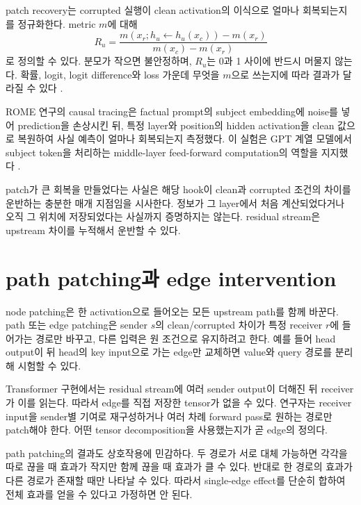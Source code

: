 patch recovery는 corrupted 실행이 clean activation의 이식으로 얼마나 회복되는지를 정규화한다.
metric $m$에 대해
\begin{equation}
  R_u=\frac{m(x_r;h_u\leftarrow h_u(x_c))-m(x_r)}
  {m(x_c)-m(x_r)}
  \label{eq:patch-recovery}
\end{equation}
로 정의할 수 있다.
분모가 작으면 불안정하며, $R_u$는 0과 1 사이에 반드시 머물지 않는다.
확률, logit, logit difference와 loss 가운데 무엇을 $m$으로 쓰는지에 따라 결과가 달라질 수 있다 \citep{zhang2024activation,heimersheim2024patching}.

ROME 연구의 causal tracing은 factual prompt의 subject embedding에 noise를 넣어 prediction을 손상시킨 뒤, 특정 layer와 position의 hidden activation을 clean 값으로 복원하여 사실 예측이 얼마나 회복되는지 측정했다.
이 실험은 GPT 계열 모델에서 subject token을 처리하는 middle-layer feed-forward computation의 역할을 지지했다 \citep{meng2022rome}.

\begin{limitbox}
patch가 큰 회복을 만들었다는 사실은 해당 hook이 clean과 corrupted 조건의 차이를 운반하는 충분한 매개 지점임을 시사한다.
정보가 그 layer에서 처음 계산되었다거나 오직 그 위치에 저장되었다는 사실까지 증명하지는 않는다.
residual stream은 upstream 차이를 누적해서 운반할 수 있다.
\end{limitbox}

\section{path patching과 edge intervention}

node patching은 한 activation으로 들어오는 모든 upstream path를 함께 바꾼다.
path 또는 edge patching은 sender $s$의 clean/corrupted 차이가 특정 receiver $r$에 들어가는 경로만 바꾸고, 다른 입력은 원 조건으로 유지하려고 한다.
예를 들어 head output이 뒤 head의 key input으로 가는 edge만 교체하면 value와 query 경로를 분리해 시험할 수 있다.

Transformer 구현에서는 residual stream에 여러 sender output이 더해진 뒤 receiver가 이를 읽는다.
따라서 edge를 직접 저장한 tensor가 없을 수 있다.
연구자는 receiver input을 sender별 기여로 재구성하거나 여러 차례 forward pass로 원하는 경로만 patch해야 한다.
어떤 tensor decomposition을 사용했는지가 곧 edge의 정의다.

path patching의 결과도 상호작용에 민감하다.
두 경로가 서로 대체 가능하면 각각을 따로 끊을 때 효과가 작지만 함께 끊을 때 효과가 클 수 있다.
반대로 한 경로의 효과가 다른 경로가 존재할 때만 나타날 수 있다.
따라서 single-edge effect를 단순히 합하여 전체 효과를 얻을 수 있다고 가정하면 안 된다.

